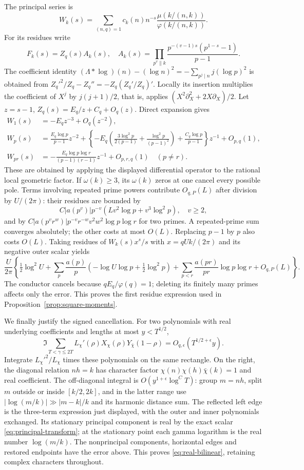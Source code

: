 The principal series is
\[
 W_k(s)=\sum_{(n,q)=1}c_k(n)n^{-s}
              \frac{\mu(k/(n,k))}{\varphi(k/(n,k))}.
\]
For its residues write
\[
 F_k(s)=Z_q(s)A_k(s),\quad
 A_k(s)=\prod_{p^v\parallel k}
             \frac{p^{-(v-1)s}(p^{1-s}-1)}{p-1}.
\]
The coefficient identity
$(\Lambda*\log)(n)-(\log n)^2=-\sum_{p^j\mid n}j(\log p)^2$
is obtained from $Z_q'^2/Z_q-Z_q''=-Z_q(Z_q'/Z_q)'$.
Locally its insertion multiplies the coefficient of $X^j$ by
$j(j+1)/2$, that is, applies $(X^2\partial_X^2+2X\partial_X)/2$.
Let $z=s-1$, $Z_q(s)=E_q/z+C_q+O_q(z)$. Direct expansion gives
\begin{align*}
 W_1(s)&=-E_qz^{-3}+O_q(z^{-2}),\\
 W_p(s)&=\frac{E_q\log p}{p-1}z^{-2}
 +\left\{-E_q\left(\frac{3\log^2p}{2(p-1)}
        +\frac{\log^2p}{(p-1)^2}\right)
        +\frac{C_q\log p}{p-1}\right\}z^{-1}+O_{p,q}(1),\\
 W_{pr}(s)&=-\frac{E_q\log p\log r}{(p-1)(r-1)}z^{-1}+O_{p,r,q}(1)
 \quad(p\ne r).
\end{align*}
These are obtained by applying the displayed differential operator
to the rational local geometric factor. If $\omega(k)\ge3$, its
$\omega(k)$ zeros at one cancel every possible pole. Terms involving
repeated prime powers contribute $O_{q,P}(L)$ after division by
$U/(2\pi)$: their residues are bounded by
\[
 C|a(p^v)|p^{-v}(Lv^2\log p+v^3\log^2p),\quad v\ge2,
\]
and by $C|a(p^vr^w)|p^{-v}r^{-w}v^2w^2\log p\log r$ for two
primes. A repeated-prime sum converges absolutely; the other costs
at most $O(L)$. Replacing $p-1$ by $p$ also costs $O(L)$.
Taking residues of $W_k(s)x^s/s$ with $x=qUk/(2\pi)$ and its
negative outer scalar yields
\[
 \frac U{2\pi}\left\{\tfrac12\log^2U
 +\sum_p\frac{a(p)}p(-\log U\log p+\tfrac12\log^2p)
 +\sum_{p<r}\frac{a(pr)}{pr}\log p\log r+O_{q,P}(L)\right\}.
\]
The conductor cancels because $qE_q/\varphi(q)=1$; deleting its
finitely many primes affects only the error. This proves the first
residue expression used in Proposition~\ref{prop:square-moments}.

We finally justify the signed cancellation. For two polynomials with
real underlying coefficients and lengths at most $y<T^{1/2}$,
\begin{equation}\label{eq:real-bilinear}
 \Im\sum_{T<\gamma\le2T}L_\chi'(\rho)
             X_\chi(\rho)Y_{\bar\chi}(1-\rho)
       =O_{q,\epsilon}(T^{1/2+\epsilon}y).
\end{equation}
Integrate $L_\chi'^2/L_\chi$ times these polynomials on the same
rectangle. On the right, the diagonal relation $nh=k$ has character
factor $\chi(n)\chi(h)\bar\chi(k)=1$ and real coefficient.
The off-diagonal integral is $O(y^{1+\epsilon}\log^C T)$: group
$m=nh$, split $m$ outside or inside $[k/2,2k]$, and in the latter
range use $|\log(m/k)|\gg|m-k|/k$ and its harmonic distance sum.
The reflected left edge is the three-term expression just displayed,
with the outer and inner polynomials exchanged. Its stationary
principal component is real by the exact scalar
\eqref{eq:principal-transform}; at the stationary point each gamma
logarithm is the real number $\log(m/k)$. The nonprincipal components,
horizontal edges and restored endpoints have the error above. This
proves \eqref{eq:real-bilinear}, retaining complex characters throughout.

